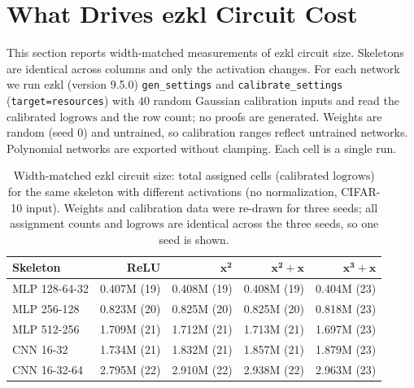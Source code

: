 \documentclass[10pt]{article}
\newcommand{\logrows}{\mathrm{logrows}}
\begin{document}
\section{What Drives ezkl Circuit Cost}
\label{sec:findings}

This section reports width-matched measurements of ezkl circuit size.  Skeletons are
identical across columns and only the activation changes.  For each network we run ezkl
(version 9.5.0) \texttt{gen\_settings} and \texttt{calibrate\_settings}
(\texttt{target=resources}) with $40$ random Gaussian calibration inputs and read the
calibrated $\logrows$ and the row count; no proofs are generated.  Weights are random
(seed $0$) and untrained, so calibration ranges reflect untrained networks.  Polynomial
networks are exported without clamping.  Each cell is a single run.

\begin{table}[h]
\centering
\caption{Width-matched ezkl circuit size: total assigned cells (calibrated $\logrows$) for the
  same skeleton with different activations (no normalization, CIFAR-10 input).  Weights and
  calibration data were re-drawn for three seeds; all assignment counts and $\logrows$ are
  identical across the three seeds, so one seed is shown.}
\label{tab:matched}
\small
\begin{tabular}{lrrrr}
\toprule
\textbf{Skeleton} & \textbf{ReLU} & $\mathbf{x^2}$ & $\mathbf{x^2{+}x}$ & $\mathbf{x^3{+}x}$ \\
\midrule
MLP 128-64-32 & 0.407M (19) & 0.408M (19) & 0.408M (19) & 0.404M (23) \\
MLP 256-128 & 0.823M (20) & 0.825M (20) & 0.825M (20) & 0.818M (23) \\
MLP 512-256 & 1.709M (21) & 1.712M (21) & 1.713M (21) & 1.697M (23) \\
CNN 16-32 & 1.734M (21) & 1.832M (21) & 1.857M (21) & 1.879M (23) \\
CNN 16-32-64 & 2.795M (22) & 2.910M (22) & 2.938M (22) & 2.963M (23) \\
\bottomrule
\end{tabular}
\end{table}
\end{document}
